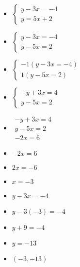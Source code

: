 \documentclass{article}
\begin{document}
\begin{enumerate}
\begin{enumerate}
\begin{itemize}
    \item $\left\{ \begin{array}{l}
          y-3x=-4 \\
          y=5x+2 \end{array} \right.$
    \item $\left\{ \begin{array}{l}
          y-3x=-4 \\
          y-5x=2 \end{array} \right.$
    \item $\left\{ \begin{array}{l}
          -1(y-3x=-4) \\
          1(y-5x=2) \end{array} \right.$
    \item $\left\{ \begin{array}{l}
          -y+3x=4 \\
          y-5x=2 \end{array} \right.$
    \item $\begin{array}{l}
          -y+3x=4 \\
          y-5x=2 \\ \hline
          -2x=6 \end{array}$
    \item $-2x=6$
    \item $2x=-6$
    \item $x=-3$
    \item $y-3x=-4$
    \item $y-3(-3)=-4$
    \item $y+9=-4$
    \item $y=-13$
    \item $(-3,-13)$
    \end{itemize}
  \end{enumerate}
\end{enumerate}

\newpage
\end{document}
